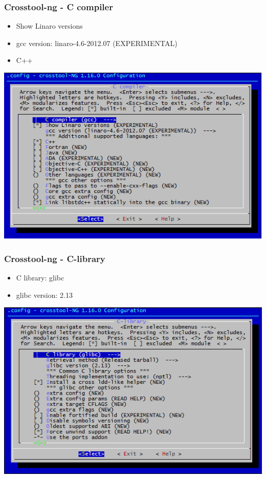 \documentclass{beamer}
\begin{document}
\begin{frame}
\frametitle{Crosstool-ng - C compiler}
\begin{small}
\begin{itemize}
\item Show Linaro versions
\item gcc version: linaro-4.6-2012.07 (EXPERIMENTAL)
\item C++
\end{itemize}
\end{small}
\begin{center}
\includegraphics[scale=.4]{image/crosstool-ng-c-compiler.png} 
\end{center}
\end{frame}

\begin{frame}
\frametitle{Crosstool-ng - C-library}
\begin{small}
\begin{itemize}
\item C library: glibc
\item glibc version: 2.13
\end{itemize}
\end{small}
\begin{center}
\includegraphics[scale=.4]{image/crosstool-ng-c-library.png} 
\end{center}
\end{frame}
\end{document}
